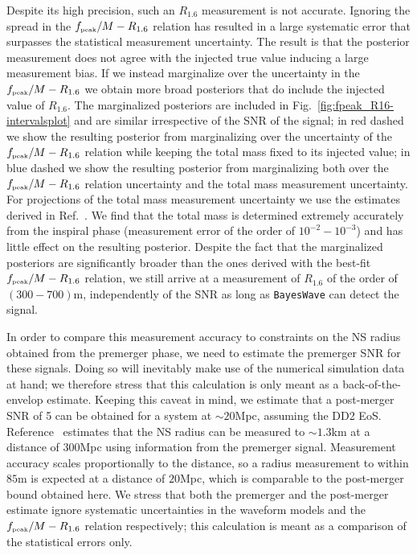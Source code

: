 \documentclass[aps,prd,amsmath,floats,floatfix, twocolumn,
superscriptaddress,nofootinbib,showpacs]{revtex4-1}
\newcommand{\peak}{{\mbox{\tiny peak}}}
\begin{document}
Despite its high precision, such an $R_{1.6}$ measurement is not accurate. Ignoring the spread in the $f_{\peak}/M-R_{1.6}$ relation has resulted in a large systematic error that surpasses the statistical measurement uncertainty. The result is that the posterior measurement does not agree with the injected true value inducing a large measurement bias. If we instead marginalize over the uncertainty in the $f_{\peak}/M-R_{1.6}$ we obtain more broad posteriors that do include the injected value of $R_{1.6}$. The marginalized posteriors are included in Fig.~\ref{fig:fpeak_R16-intervalsplot} and are similar irrespective of the SNR of the signal; in red dashed we show the resulting posterior from marginalizing over the uncertainty of the $f_{\peak}/M-R_{1.6}$ relation while keeping the total mass fixed to its injected value; in blue dashed we show the resulting posterior from marginalizing both over the $f_{\peak}/M-R_{1.6}$ relation uncertainty and the total mass measurement uncertainty. For projections of the total mass measurement uncertainty we use the estimates derived in Ref.~\cite{Farr:2015lna}. We find that the total mass is determined extremely accurately from the inspiral phase (measurement error of the order of $10^{-2}-10^{-3}$) and has little effect on the resulting posterior. Despite the fact that the marginalized posteriors are significantly broader than the ones derived with the best-fit $f_{\peak}/M-R_{1.6}$ relation, we still arrive at a measurement of $R_{1.6}$ of the order of $(300-700)$m, independently of the SNR as long as {\tt BayesWave} can detect the signal.

In order to compare this measurement accuracy to constraints on the NS radius obtained from the premerger phase, we need to estimate the premerger SNR for these signals. Doing so will inevitably make use of the numerical simulation data at hand; we therefore stress that this calculation is only meant as a back-of-the-envelop estimate. Keeping this caveat in mind, we estimate that a post-merger SNR of 5 can be obtained for a system at $\sim 20$Mpc, assuming the DD2 EoS. Reference~\cite{2013PhRvD..88d4042R} estimates that the NS radius can be measured to $\sim 1.3$km at a distance of $300$Mpc using information from the premerger signal. Measurement accuracy scales proportionally to the distance, so a radius measurement to within $85$m is expected at a distance of $20$Mpc, which is comparable to the post-merger bound obtained here. We stress that both the premerger and the post-merger estimate ignore systematic uncertainties in the waveform models and the $f_{\peak}/M-R_{1.6}$ relation respectively; this calculation is meant as a comparison of the statistical errors only.
\end{document}
